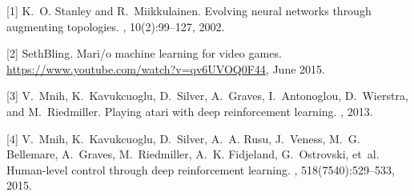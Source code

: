 \documentclass[t,pdflatex]{beamer}
\begin{document}
    \begin{frame}
        \begin{thebibliography}{10}
        \beamertemplatearticlebibitems{}



        [1] K.~O. Stanley and R.~Miikkulainen.
        \newblock Evolving neural networks through augmenting topologies.
        , 10(2):99--127, 2002.

        [2] SethBling.
        \newblock Mari/o machine learning for video games.
        \newblock \url{https://www.youtube.com/watch?v=qv6UVOQ0F44}, June 2015.

        [3] V.~Mnih, K.~Kavukcuoglu, D.~Silver, A.~Graves, I.~Antonoglou, D.~Wierstra, and
          M.~Riedmiller.
        \newblock Playing atari with deep reinforcement learning.
        , 2013.

        [4] V.~Mnih, K.~Kavukcuoglu, D.~Silver, A.~A. Rusu, J.~Veness, M.~G. Bellemare,
          A.~Graves, M.~Riedmiller, A.~K. Fidjeland, G.~Ostrovski, et~al.
        \newblock Human-level control through deep reinforcement learning.
        , 518(7540):529--533, 2015.



        \end{thebibliography}
        \end{frame}
\end{document}
